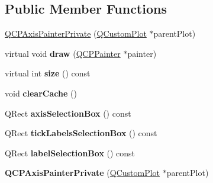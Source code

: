 \subsection*{Public Member Functions}
\begin{DoxyCompactItemize}
\item 
\hyperlink{class_q_c_p_axis_painter_private_a0f14aa5c4aa83dbcd68984a7c73bf94f}{Q\+C\+P\+Axis\+Painter\+Private} (\hyperlink{class_q_custom_plot}{Q\+Custom\+Plot} $\ast$parent\+Plot)
\item 
virtual void {\bfseries draw} (\hyperlink{class_q_c_p_painter}{Q\+C\+P\+Painter} $\ast$painter)\hypertarget{class_q_c_p_axis_painter_private_a0207a99bdf9c4f70af20928898ddc2fc}{}\label{class_q_c_p_axis_painter_private_a0207a99bdf9c4f70af20928898ddc2fc}

\item 
virtual int {\bfseries size} () const \hypertarget{class_q_c_p_axis_painter_private_a8b2dc0bd2ccbf6bd450733ec9e410a38}{}\label{class_q_c_p_axis_painter_private_a8b2dc0bd2ccbf6bd450733ec9e410a38}

\item 
void {\bfseries clear\+Cache} ()\hypertarget{class_q_c_p_axis_painter_private_a7b6806e32c44384fd0ae4dcdaa72b1b5}{}\label{class_q_c_p_axis_painter_private_a7b6806e32c44384fd0ae4dcdaa72b1b5}

\item 
Q\+Rect {\bfseries axis\+Selection\+Box} () const \hypertarget{class_q_c_p_axis_painter_private_aaf93529ac60215ea020cdff5635c3e80}{}\label{class_q_c_p_axis_painter_private_aaf93529ac60215ea020cdff5635c3e80}

\item 
Q\+Rect {\bfseries tick\+Labels\+Selection\+Box} () const \hypertarget{class_q_c_p_axis_painter_private_af02fc189ab8460c202eb4138c9aca516}{}\label{class_q_c_p_axis_painter_private_af02fc189ab8460c202eb4138c9aca516}

\item 
Q\+Rect {\bfseries label\+Selection\+Box} () const \hypertarget{class_q_c_p_axis_painter_private_ae907476bf8cf0ecd17620575e17c06b1}{}\label{class_q_c_p_axis_painter_private_ae907476bf8cf0ecd17620575e17c06b1}

\item 
{\bfseries Q\+C\+P\+Axis\+Painter\+Private} (\hyperlink{class_q_custom_plot}{Q\+Custom\+Plot} $\ast$parent\+Plot)\hypertarget{class_q_c_p_axis_painter_private_a0f14aa5c4aa83dbcd68984a7c73bf94f}{}\label{class_q_c_p_axis_painter_private_a0f14aa5c4aa83dbcd68984a7c73bf94f}


\end{DoxyCompactItemize}
